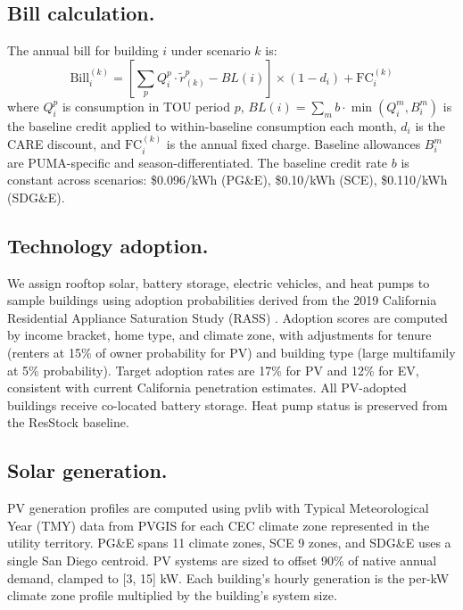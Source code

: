 \documentclass[9pt,twocolumn,twoside]{pnas-new}
\begin{document}
\subsection*{Bill calculation.}
The annual bill for building $i$ under scenario $k$ is:
\begin{equation}
    \text{Bill}_i^{(k)} = \left[ \sum_p Q_i^p \cdot \tilde{r}^p_{(k)} - BL(i) \right] \times (1 - d_i) + \text{FC}_i^{(k)}
\end{equation}
where $Q_i^p$ is consumption in TOU period $p$, $BL(i) = \sum_m b \cdot \min(Q_i^m, B_i^m)$ is the baseline credit applied to within-baseline consumption each month, $d_i$ is the CARE discount, and $\text{FC}_i^{(k)}$ is the annual fixed charge. Baseline allowances $B_i^m$ are PUMA-specific and season-differentiated. The baseline credit rate $b$ is constant across scenarios: \$0.096/kWh (PG\&E), \$0.10/kWh (SCE), \$0.110/kWh (SDG\&E).

\subsection*{Technology adoption.}
We assign rooftop solar, battery storage, electric vehicles, and heat pumps to sample buildings using adoption probabilities derived from the 2019 California Residential Appliance Saturation Study (RASS) \cite{rass2019}. Adoption scores are computed by income bracket, home type, and climate zone, with adjustments for tenure (renters at 15\% of owner probability for PV) and building type (large multifamily at 5\% probability). Target adoption rates are 17\% for PV and 12\% for EV, consistent with current California penetration estimates. All PV-adopted buildings receive co-located battery storage. Heat pump status is preserved from the ResStock baseline.

\subsection*{Solar generation.}
PV generation profiles are computed using pvlib \cite{pvlib2018} with Typical Meteorological Year (TMY) data from PVGIS for each CEC climate zone represented in the utility territory. PG\&E spans 11 climate zones, SCE 9 zones, and SDG\&E uses a single San Diego centroid. PV systems are sized to offset 90\% of native annual demand, clamped to [3, 15] kW. Each building's hourly generation is the per-kW climate zone profile multiplied by the building's system size.
\end{document}
